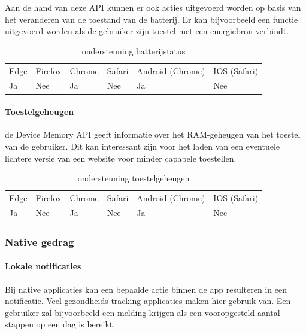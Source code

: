 Aan de hand van deze API kunnen er ook acties uitgevoerd worden op basis van het veranderen van de toestand van de batterij. Er kan bijvoorbeeld een functie uitgevoerd worden als de gebruiker zijn toestel met een energiebron verbindt.

\begin{table}[H]
	\centering
	\begin{tabular}{llllll}
		Edge & Firefox & Chrome & Safari & Android (Chrome) & IOS (Safari) \\
		Ja   & Nee      &  Ja     & Nee     & Ja               & Nee          
	\end{tabular}	
	\caption{ondersteuning batterijstatus  }
	\label{ondersteuning batterijstatus }
\end{table}

\paragraph{Toestelgeheugen}
de Device Memory API \autocite{Panicker2020} geeft informatie over het RAM-geheugen van het toestel van de gebruiker. Dit kan interessant zijn voor het laden van een eventuele lichtere versie van een website voor minder capabele toestellen.

\begin{table}[H]
	\centering
	\begin{tabular}{llllll}
		Edge & Firefox & Chrome & Safari & Android (Chrome) & IOS (Safari) \\
		Ja   & Nee      &  Ja     & Nee     & Ja               & Nee          
	\end{tabular}	
	\caption{ondersteuning toestelgeheugen }
	\label{ondersteuning toestelgeheugen }
\end{table}



\subsubsection{Native gedrag}

\paragraph{Lokale notificaties}
Bij native applicaties kan een bepaalde actie binnen de app resulteren in een notificatie. Veel gezondheids-tracking applicaties maken hier gebruik van. Een gebruiker zal bijvoorbeeld een melding krijgen als een vooropgesteld aantal stappen op een dag is bereikt.

